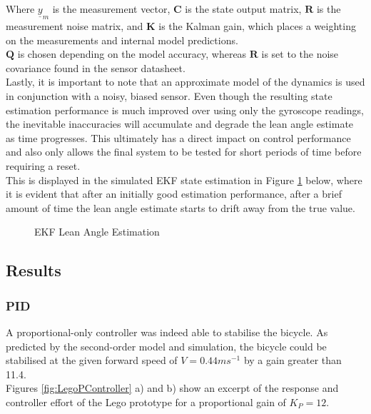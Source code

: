 Where $\underline{y}_m$ is the measurement vector, $\mathbf{C}$ is the state output matrix, $\mathbf{R}$ is the measurement noise matrix, and $\mathbf{K}$ is the Kalman gain, which places a weighting on the measurements and internal model predictions. \\
$\mathbf{Q}$ is chosen depending on the model accuracy, whereas $\mathbf{R}$ is set to the noise covariance found in the sensor datasheet. \\

Lastly, it is important to note that an approximate model of the dynamics is used in conjunction with a noisy, biased sensor. Even though the resulting state estimation performance is much improved over using only the gyroscope readings, the inevitable inaccuracies will accumulate and degrade the lean angle estimate as time progresses. This ultimately has a direct impact on control performance and also only allows the final system to be tested for short periods of time before requiring a reset. \\

This is displayed in the simulated EKF state estimation in Figure \ref{fig:LegoKalman} below, where it is evident that after an initially good estimation performance, after a brief amount of time the lean angle estimate starts to drift away from the true value.

\begin{figure}[H]
	\centering
	\caption{EKF Lean Angle Estimation}
	\label{fig:LegoKalman}
\end{figure}

\subsection{Results}

\subsubsection{PID}
A proportional-only controller was indeed able to stabilise the bicycle. As predicted by the second-order model and simulation, the bicycle could be stabilised at the given forward speed of $V=0.44ms^{-1}$ by a gain greater than 11.4. \\
Figures \ref{fig:LegoPController} a) and b) show an excerpt of the response and controller effort of the Lego prototype for a proportional gain of $K_P=12$.

